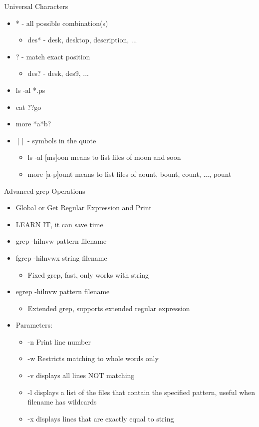 \documentclass{beamer}
\begin{document}
\begin{frame}{Universal Characters}
\begin{itemize}
\item * - all possible combination(s)
\begin{itemize}
\item des* - desk, desktop, description, ...
\end{itemize}
\item ? - match exact position
\begin{itemize}
\item des? - desk, des9, ...
\end{itemize}
\item ls -al *.ps
\item cat ??go
\item more *a*b?
\item $[ ]$ - symbols in the quote
\begin{itemize}
\item ls -al $[$ms$]$oon means to list files of moon and soon
\item more $[$a-p$]$ount means to list files of aount, bount, count, ...,  pount
\end{itemize}
\end{itemize}
\end{frame}

\begin{frame}{Advanced grep Operations}
\begin{itemize}
\item Global or Get Regular Expression and Print
\item LEARN IT, it can save time
\item grep -hilnvw pattern filename
\item fgrep -hilnvwx string filename 
\begin{itemize}
\item Fixed grep, fast, only works with string
\end{itemize}
\item egrep -hilnvw pattern filename
\begin{itemize}
\item Extended grep, supports extended regular expression
\end{itemize}
\item Parameters:
\begin{itemize}
\item -n Print line number
\item -w Restricts matching to whole words only
\item -v displays all lines NOT matching
\item -l displays a list of the files that contain the specified pattern, useful when filename has wildcards
\item -x displays lines that are exactly equal to string
\end{itemize}
\end{itemize}
\end{frame}
\end{document}
